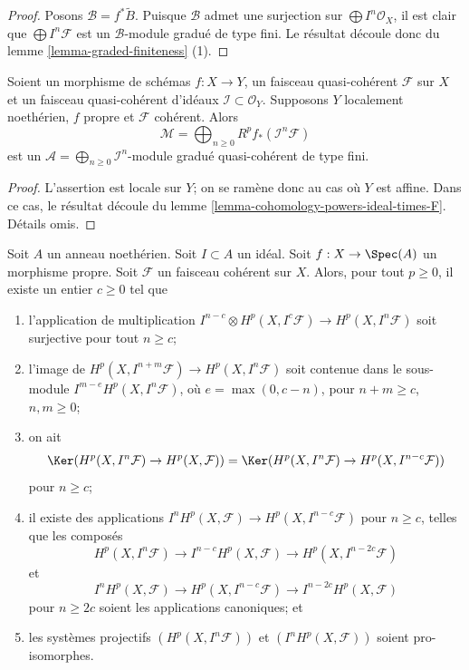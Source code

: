 \begin{proof}
Posons $\mathcal{B} = f^*\widetilde{B}$. Puisque $\mathcal{B}$ admet une
surjection sur $\bigoplus I^n\mathcal{O}_X$, il est clair que
$\bigoplus I^n\mathcal{F}$ est un $\mathcal{B}$-module gradué
de type fini. Le résultat découle donc du lemme \ref{lemma-graded-finiteness} (1).
\end{proof}

\begin{lemma}
\label{lemma-cohomology-powers-ideal-times-sheaf}
Soient un morphisme de schémas $f : X \to Y$, un faisceau quasi-cohérent
$\mathcal{F}$ sur $X$ et un faisceau quasi-cohérent d'idéaux
$\mathcal{I} \subset \mathcal{O}_Y$. Supposons $Y$ localement
noethérien, $f$ propre et $\mathcal{F}$ cohérent.
Alors
$$
\mathcal{M} =
\bigoplus\nolimits_{n \geq 0} R^pf_*(\mathcal{I}^n\mathcal{F})
$$
est un $\mathcal{A} = \bigoplus_{n \geq 0} \mathcal{I}^n$-module
gradué quasi-cohérent de type fini.
\end{lemma}

\begin{proof}
L'assertion est locale sur $Y$; on se ramène donc au
cas où $Y$ est affine. Dans ce cas, le résultat découle
du lemme \ref{lemma-cohomology-powers-ideal-times-F}.
Détails omis.
\end{proof}

\begin{lemma}
\label{lemma-cohomology-powers-ideal-application}
Soit $A$ un anneau noethérien.
Soit $I \subset A$ un idéal.
Soit $f : X \to \Spec(A)$ un morphisme propre.
Soit $\mathcal{F}$ un faisceau cohérent sur $X$.
Alors, pour tout $p \geq 0$, il existe un entier $c \geq 0$
tel que
\begin{enumerate}
\item l'application de multiplication
$I^{n - c} \otimes H^p(X, I^c\mathcal{F}) \to H^p(X, I^n\mathcal{F})$
soit surjective pour tout $n \geq c$;
\item l'image de $H^p(X, I^{n + m}\mathcal{F}) \to H^p(X, I^n\mathcal{F})$
soit contenue dans le sous-module $I^{m - e} H^p(X, I^n\mathcal{F})$,
où $e = \max(0, c - n)$, pour $n + m \geq c$, $n, m \geq 0$;
\item on ait
$$
\Ker(H^p(X, I^n\mathcal{F}) \to H^p(X, \mathcal{F})) =
\Ker(H^p(X, I^n\mathcal{F}) \to H^p(X, I^{n - c}\mathcal{F}))
$$
pour $n \geq c$;
\item il existe des applications $I^nH^p(X, \mathcal{F}) \to H^p(X, I^{n - c}\mathcal{F})$
pour $n \geq c$, telles que les composés
$$
H^p(X, I^n\mathcal{F}) \to
I^{n - c}H^p(X, \mathcal{F}) \to
H^p(X, I^{n - 2c}\mathcal{F})
$$
et
$$
I^nH^p(X, \mathcal{F}) \to
H^p(X, I^{n - c}\mathcal{F}) \to
I^{n - 2c}H^p(X, \mathcal{F})
$$
pour $n \geq 2c$ soient les applications canoniques; et
\item les systèmes projectifs $(H^p(X, I^n\mathcal{F}))$ et
$(I^nH^p(X, \mathcal{F}))$ soient pro-isomorphes.
\end{enumerate}
\end{lemma}

